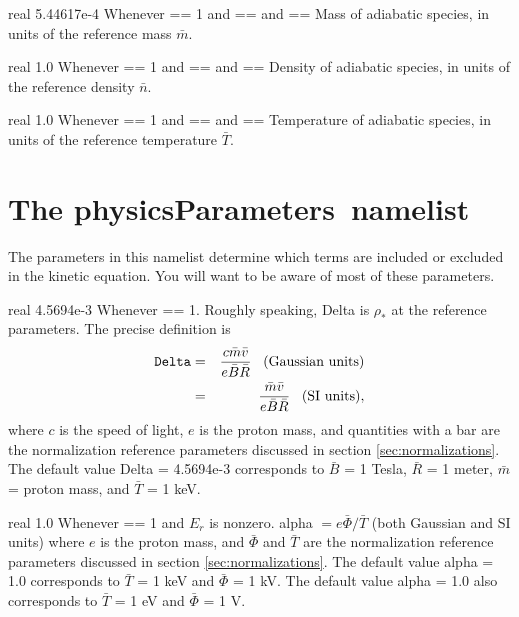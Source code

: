 \myhrule

{real}
{5.44617e-4}
{Whenever  == 1 and  == \true and  == \true}
{Mass of adiabatic species, in units of the reference mass $\bar{m}$.}

\myhrule

{real}
{1.0}
{Whenever  == 1 and  == \true and  == \true}
{Density of adiabatic species, in units of the reference density $\bar{n}$.}

\myhrule

{real}
{1.0}
{Whenever  == 1 and  == \true and  == \true}
{Temperature of adiabatic species, in units of the reference temperature $\bar{T}$.}




\section{The {\ttfamily physicsParameters}~namelist}
\label{sec:physicsParameters}

The parameters in this namelist determine which terms are included or excluded in the kinetic equation.
You will want to be aware of most of these parameters.

\myhrule

{real}
{4.5694e-3}
{Whenever  == 1.}
{Roughly speaking, {\ttfamily Delta} is $\rho_*$ at the reference parameters. The precise definition is
\begin{eqnarray}
\mbox{\ttfamily Delta} 
&=& \frac{c \bar{m} \bar{v}}{e \bar{B} \bar{R}} \;\;\; \mbox{(Gaussian units)} \\
&=&  \frac{\bar{m} \bar{v}}{e \bar{B} \bar{R}} \;\;\; \mbox{(SI units)}, \nonumber
\end{eqnarray}
where $c$ is the speed of light,
$e$ is the proton mass,
and quantities with a bar are the normalization reference parameters discussed in section \ref{sec:normalizations}.
The default value {\ttfamily Delta} = 4.5694e-3 corresponds to $\bar{B}$ = 1 Tesla, $\bar{R}$ = 1 meter,
$\bar{m}$ = proton mass, and $\bar{T}$ = 1 keV.}

\myhrule

{real}
{1.0}
{Whenever  == 1 and $E_r$ is nonzero.}
{{\ttfamily alpha} $= e \bar{\Phi}/ \bar{T}$ (both Gaussian and SI units) where $e$ is the proton mass,
and $\bar{\Phi}$ and $\bar{T}$ are the normalization reference parameters discussed in section \ref{sec:normalizations}.
The default value {\ttfamily alpha} = 1.0 corresponds to $\bar{T}$ = 1 keV and $\bar{\Phi}$ = 1 kV.
The default value {\ttfamily alpha} = 1.0 also corresponds to $\bar{T}$ = 1 eV and $\bar{\Phi}$ = 1 V.
}

